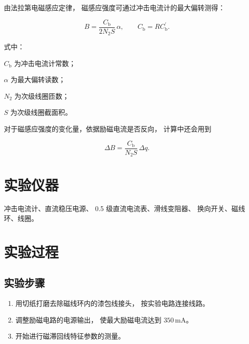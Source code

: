 \documentclass[UTF8,a4paper,12pt,fontset=none]{ctexart}
\newcommand{\ddq}{\Delta q}
\newcommand{\Cb}{C_{\mathrm b}}
\begin{document}
由法拉第电磁感应定律，
磁感应强度可通过冲击电流计的最大偏转测得：

\begin{equation}
\label{eq:core}
B=\frac{\Cb}{2N_2S}\,\alpha,
\qquad
\Cb=R C_{\mathrm b}^{\prime}.
\end{equation}

式中：

$\Cb$ 为冲击电流计常数；

$\alpha$ 为最大偏转读数；

$N_2$ 为次级线圈匝数；

$S$ 为次级线圈截面积。

对于磁感应强度的变化量，依据励磁电流是否反向，
计算中还会用到

\begin{equation}
\label{eq:delta}
\Delta B=\frac{\Cb}{N_2S}\,\ddq.
\end{equation}


\section{实验仪器}

冲击电流计、直流稳压电源、
0.5 级直流电流表、滑线变阻器、
换向开关、磁线环、线圈。


\section{实验过程}

\subsection{实验步骤}

\begin{enumerate}

\item 用切纸打磨去除磁线环内的漆包线接头，
按实验电路连接线路。

\item 调整励磁电路的电源输出，
使最大励磁电流达到 $350\,\mathrm{mA}$。

\item 开始进行磁滞回线特征参数的测量。

\end{enumerate}

\end{document}
